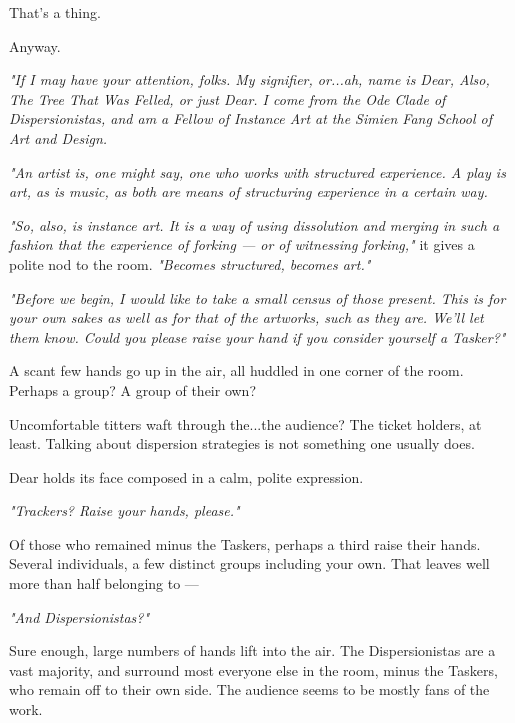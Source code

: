 \newpage

\null
\vfill

That's a thing.

\vfill

\newpage

\null
\vfill

\begin{flushright}
  Anyway.
\end{flushright}

\vfill

\newpage

\emph{"If I may have your attention, folks. My signifier, or...ah, name is Dear, Also, The Tree That Was Felled, or just Dear. I come from the Ode Clade of Dispersionistas, and am a Fellow of Instance Art at the Simien Fang School of Art and Design.}

\emph{"An artist is, one might say, one who works with structured experience. A play is art, as is music, as both are means of structuring experience in a certain way.}

\emph{"So, also, is instance art. It is a way of using dissolution and merging in such a fashion that the experience of forking --- or of witnessing forking,"} it gives a polite nod to the room. \emph{"Becomes structured, becomes art."}

\emph{"Before we begin, I would like to take a small census of those present. This is for your own sakes as well as for that of the artworks, such as they are. We'll let them know. Could you please raise your hand if you consider yourself a Tasker?"}

A scant few hands go up in the air, all huddled in one corner of the room. Perhaps a group? A group of their own?

Uncomfortable titters waft through the...the audience? The ticket holders, at least. Talking about dispersion strategies is not something one usually does.

Dear holds its face composed in a calm, polite expression.

\emph{"Trackers? Raise your hands, please."}

Of those who remained minus the Taskers, perhaps a third raise their hands. Several individuals, a few distinct groups including your own. That leaves well more than half belonging to ---

\emph{"And Dispersionistas?"}

Sure enough, large numbers of hands lift into the air. The Dispersionistas are a vast majority, and surround most everyone else in the room, minus the Taskers, who remain off to their own side. The audience seems to be mostly fans of the work.

